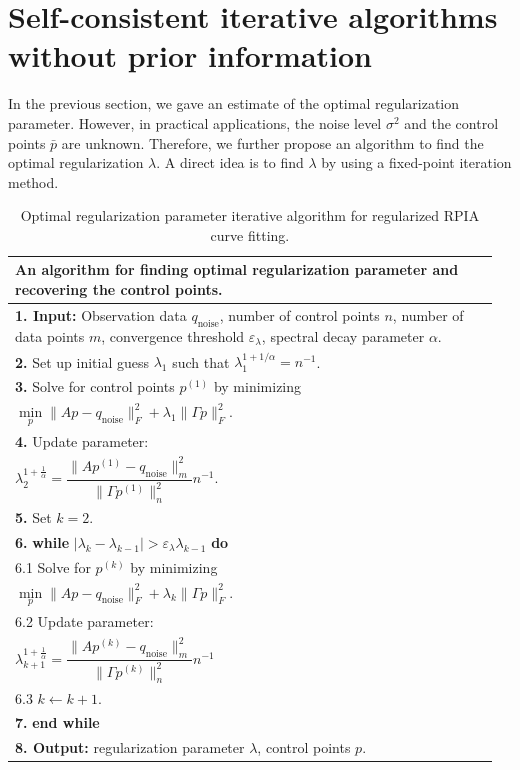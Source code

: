 \documentclass[11pt]{article}
\numberwithin{equation}{section}
\begin{document}
\section{Self-consistent iterative algorithms without prior information}\label{section6}
In the previous section, we gave an estimate of the optimal regularization parameter. However, in practical applications, the noise level $\sigma^2$ and the control points $\bar{p}$ are unknown. Therefore, we further propose an algorithm to find the optimal regularization $\lambda$. A direct idea is to find $\lambda$ by using a fixed-point iteration method. 

\begin{table}[htbp]
\small
\centering
\caption{Optimal regularization parameter iterative algorithm for regularized RPIA curve fitting.}
\begin{tabular}{|p{0.96\linewidth}|}
\hline
\textbf{An algorithm for finding optimal regularization parameter and recovering the control points.} \\
\hline
\textbf{1. Input:} Observation data $q_\mathrm{noise}$, number of control points $n$, number of data points $m$, convergence threshold $\varepsilon_\lambda$, spectral decay parameter $\alpha$. \\
\textbf{2.} Set up initial guess $\lambda_1$ such that $\lambda_1^{1+1/\alpha} = n^{-1}$. \\
\textbf{3.} Solve for control points $p^{(1)}$ by minimizing \\
\hspace*{3em} $\min\limits_{p} \|A p - q_\mathrm{noise}\|_F^2 + \lambda_1 \|\Gamma p\|_F^2$. \\
\textbf{4.} Update parameter: \\
\hspace*{3em} $\lambda_2^{1+\frac{1}{\alpha}} = \dfrac{\|A p^{(1)} - q_\mathrm{noise}\|_m^2}{\|\Gamma p^{(1)}\|_n^2} n^{-1}$. \\
\textbf{5.} Set $k = 2$. \\
\textbf{6.} \textbf{while} $|\lambda_k - \lambda_{k-1}| > \varepsilon_\lambda \lambda_{k-1}$ \textbf{do} \\
\hspace*{2em} 6.1 Solve for $p^{(k)}$ by minimizing \\
\hspace*{3em} $\min\limits_{p} \|A p - q_\mathrm{noise}\|_F^2 + \lambda_k \|\Gamma p\|_F^2$. \\
\hspace*{2em} 6.2 Update parameter: \\
\hspace*{3em} $\lambda_{k+1}^{1+\frac{1}{\alpha}} = \dfrac{\|A p^{(k)} - q_\mathrm{noise}\|_m^2}{\|\Gamma p^{(k)}\|_n^2} n^{-1}$ \\
\hspace*{2em} 6.3 $k \leftarrow k + 1$. \\
\textbf{7.} \textbf{end while} \\
\textbf{8. Output:} regularization parameter $\lambda$,  control points $p$. \\
\hline
\end{tabular}
\end{table}
\end{document}
